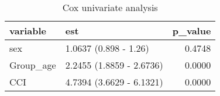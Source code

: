 \begin{table}

\caption{Cox univariate analysis}
\centering
\begin{tabular}[t]{l|l|r}
\hline
variable & est & p\_value\\
\hline
sex & 1.0637 (0.898 - 1.26) & 0.4748\\
\hline
Group\_age & 2.2455 (1.8859 - 2.6736) & 0.0000\\
\hline
CCI & 4.7394 (3.6629 - 6.1321) & 0.0000\\
\hline
\end{tabular}
\end{table}
